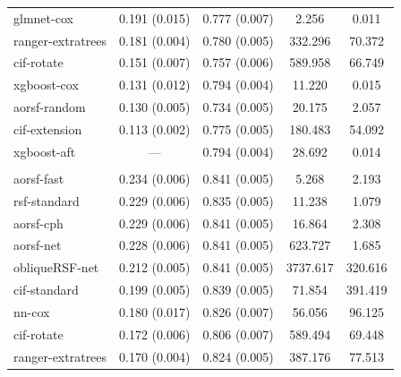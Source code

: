 \documentclass{article}\usepackage[]{graphicx}\usepackage[]{xcolor}
\newenvironment{knitrout}{}{} %
\begin{document}
\begin{knitrout}
\begin{longtable}[t]{lcccc}
\hspace{1em}glmnet-cox & 0.191 (0.015) & 0.777 (0.007) & 2.256 & 0.011\\
\hspace{1em}ranger-extratrees & 0.181 (0.004) & 0.780 (0.005) & 332.296 & 70.372\\
\hspace{1em}cif-rotate & 0.151 (0.007) & 0.757 (0.006) & 589.958 & 66.749\\
\hspace{1em}xgboost-cox & 0.131 (0.012) & 0.794 (0.004) & 11.220 & 0.015\\
\hspace{1em}aorsf-random & 0.130 (0.005) & 0.734 (0.005) & 20.175 & 2.057\\
\hspace{1em}cif-extension & 0.113 (0.002) & 0.775 (0.005) & 180.483 & 54.092\\
\hspace{1em}xgboost-aft & --- & 0.794 (0.004) & 28.692 & 0.014\\
\addlinespace[0.3em]
\multicolumn{5}{l}{\textit{\textbf{ARIC; heart failure, n = 13623, p = 41}}}\\
\hline
\hspace{1em}aorsf-fast & 0.234 (0.006) & 0.841 (0.005) & 5.268 & 2.193\\
\hspace{1em}rsf-standard & 0.229 (0.006) & 0.835 (0.005) & 11.238 & 1.079\\
\hspace{1em}aorsf-cph & 0.229 (0.006) & 0.841 (0.005) & 16.864 & 2.308\\
\hspace{1em}aorsf-net & 0.228 (0.006) & 0.841 (0.005) & 623.727 & 1.685\\
\hspace{1em}obliqueRSF-net & 0.212 (0.005) & 0.841 (0.005) & 3737.617 & 320.616\\
\hspace{1em}cif-standard & 0.199 (0.005) & 0.839 (0.005) & 71.854 & 391.419\\
\hspace{1em}nn-cox & 0.180 (0.017) & 0.826 (0.007) & 56.056 & 96.125\\
\hspace{1em}cif-rotate & 0.172 (0.006) & 0.806 (0.007) & 589.494 & 69.448\\
\hspace{1em}ranger-extratrees & 0.170 (0.004) & 0.824 (0.005) & 387.176 & 77.513\\

\end{longtable}
\end{knitrout}
\end{document}
